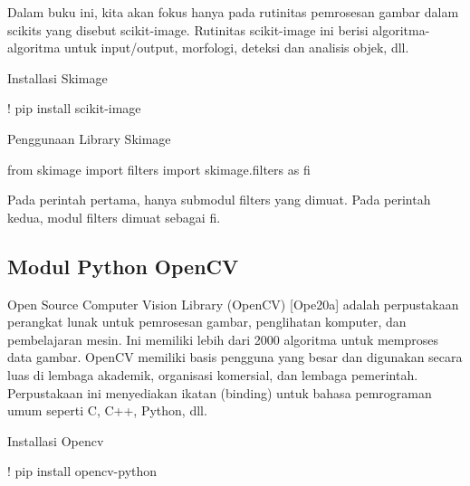 \documentclass[
  letterpaper,
  DIV=11,
  numbers=noendperiod]{scrreprt}
\newenvironment{Shaded}{\begin{snugshade}}{\end{snugshade}}
\newcommand{\ImportTok}[1]{\textcolor[rgb]{0.00,0.46,0.62}{#1}}
\newcommand{\NormalTok}[1]{\textcolor[rgb]{0.00,0.23,0.31}{#1}}
\newcommand{\OperatorTok}[1]{\textcolor[rgb]{0.37,0.37,0.37}{#1}}
\begin{document}
Dalam buku ini, kita akan fokus hanya pada rutinitas pemrosesan gambar
dalam scikits yang disebut scikit-image. Rutinitas scikit-image ini
berisi algoritma-algoritma untuk input/output, morfologi, deteksi dan
analisis objek, dll.

Installasi Skimage

\begin{Shaded}
\begin{Highlighting}[]
\OperatorTok{!}\NormalTok{ pip install scikit}\OperatorTok{{-}}\NormalTok{image}
\end{Highlighting}
\end{Shaded}

Penggunaan Library Skimage

\begin{Shaded}
\begin{Highlighting}[]
\ImportTok{from}\NormalTok{ skimage }\ImportTok{import}\NormalTok{ filters}
\ImportTok{import}\NormalTok{ skimage.filters }\ImportTok{as}\NormalTok{ fi}
\end{Highlighting}
\end{Shaded}

Pada perintah pertama, hanya submodul filters yang dimuat. Pada perintah
kedua, modul filters dimuat sebagai fi.

\hypertarget{modul-python-opencv}{%
\subsection*{Modul Python OpenCV}\label{modul-python-opencv}}

Open Source Computer Vision Library (OpenCV) {[}Ope20a{]} adalah
perpustakaan perangkat lunak untuk pemrosesan gambar, penglihatan
komputer, dan pembelajaran mesin. Ini memiliki lebih dari 2000 algoritma
untuk memproses data gambar. OpenCV memiliki basis pengguna yang besar
dan digunakan secara luas di lembaga akademik, organisasi komersial, dan
lembaga pemerintah. Perpustakaan ini menyediakan ikatan (binding) untuk
bahasa pemrograman umum seperti C, C++, Python, dll.

Installasi Opencv

\begin{Shaded}
\begin{Highlighting}[]
\OperatorTok{!}\NormalTok{ pip install opencv}\OperatorTok{{-}}\NormalTok{python}
\end{Highlighting}
\end{Shaded}
\end{document}
